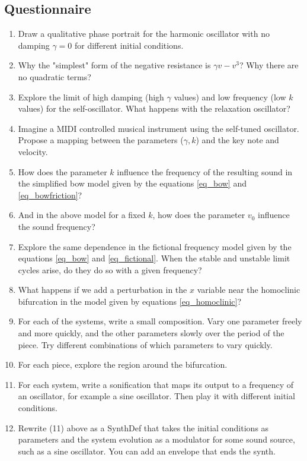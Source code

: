 \documentclass{article}
\begin{document}
\subsection{Questionnaire}
\begin{enumerate}
\item Draw a qualitative phase portrait for the harmonic oscillator with no damping $\gamma=0$ for different initial conditions.
\item Why the "simplest" form of the negative resistance is $\gamma v - v^3$? Why there are no quadratic terms?
\item Explore the limit of high damping (high $\gamma$ values) and low frequency (low $k$ values) for the self-oscillator. What happens with the relaxation oscillator?
\item Imagine a MIDI controlled musical instrument using the self-tuned oscillator. Propose a mapping between the parameters ($\gamma,k$) and the key note and velocity. 
\item How does the parameter $k$ influence the frequency of the resulting sound in the simplified bow model given by the equations \ref{eq_bow} and \ref{eq_bowfriction}? 
\item And in the above model for a fixed $k$, how does the parameter $v_0$ influence the sound frequency?
\item Explore the same dependence in the fictional frequency model given by the equations \ref{eq_bow} and \ref{eq_fictional}. When the stable and unstable limit cycles arise, do they do so with a given frequency?
\item What happens if we add a perturbation in the $x$ variable near the homoclinic bifurcation in the model given by equations \ref{eq_homoclinic}?
\item For each of the systems, write a small composition. Vary one parameter freely and more quickly, and the other parameters slowly over the period of the piece. Try different combinations of which parameters to vary quickly. 
\item For each piece, explore the region around the bifurcation.
\item For each system, write a sonification that maps its output to a frequency of an oscillator, for example a sine oscillator. Then play it with different initial conditions. 
\item Rewrite (11) above as a SynthDef that takes the initial conditions as parameters and the system evolution as a modulator for some sound source, such as a sine oscillator. You can add an envelope that ends the synth.
\end{enumerate}
\end{document}

